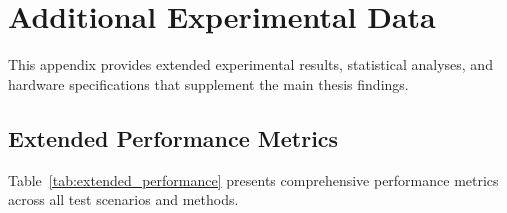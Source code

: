 \chapter{Additional Experimental Data}
\label{appendix:data}

This appendix provides extended experimental results, statistical analyses, and hardware specifications that supplement the main thesis findings.

\section{Extended Performance Metrics}
\label{sec:extended_metrics}

Table~\ref{tab:extended_performance} presents comprehensive performance metrics across all test scenarios and methods.

